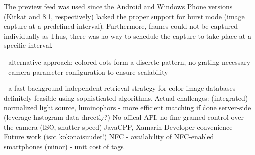 \documentclass[thesis.tex]{subfiles}
\begin{document}

The preview feed was used since the Android and Windows Phone versions (Kitkat and 8.1, respectively) lacked the proper support for burst mode (image capture at a predefined interval). Furthermore, frames could not be captured individually as Thus, there was no way to schedule the capture to take place at a specific interval.

- alternative approach: colored dots form a discrete pattern, no grating necessary
- camera parameter configuration to ensure scalability

- a fast background-independent retrieval strategy for color image databases
- definitely feasible using sophisticated algorithms. Actual challenges: (integrated) normalized light source, luminophors
- more efficient matching if done server-side (leverage histogram data directly?)
No offical API, no fine grained control over the camera (ISO, shutter speed)
JavaCPP, Xamarin
Developer convenience
Future work (isot kokonaisuudet!)
NFC
- availability of NFC-enabled smartphones (minor)
- unit cost of tags

\begin{comment}
Color calibration

There are mainly two modules responsible for the color-rendering accuracy of a digital camera: the former is the illuminant estimation and correction module, and the latter is the color matrix transformation aimed to adapt the color response of the sensor to a standard color space. These two modules together form what may be called the color correction pipeline.

RGB is a device-dependent color model: different devices detect or reproduce a given RGB value differently, since the color elements (such as phosphors or dyes) and their response to the individual R, G, and B levels vary from manufacturer to manufacturer, or even in the same device over time. Thus an RGB value does not define the same color across devices without some kind of color management.

\url{http://www.cis.rit.edu/~jxj1770/publications/paperEI_Xerox.pdf}

\url{http://www.cs.unc.edu/techreports/04-012.pdf}
\end{comment}
\end{document}
